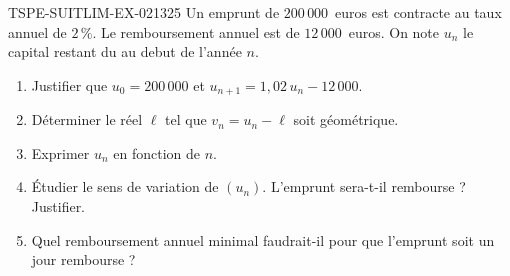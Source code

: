 \begin{exercice}{TSPE-SUITLIM-EX-021}{3}{25}
Un emprunt de $200\,000$~euros est contracte au taux annuel de $2\,\%$. Le remboursement annuel est de $12\,000$~euros. On note $u_n$ le capital restant du au debut de l'année $n$.
\begin{enumerate}
  \item Justifier que $u_0 = 200\,000$ et $u_{n+1} = 1{,}02\,u_n - 12\,000$.
  \item Déterminer le réel $\ell$ tel que $v_n = u_n - \ell$ soit géométrique.
  \item Exprimer $u_n$ en fonction de $n$.
  \item Étudier le sens de variation de $(u_n)$. L'emprunt sera-t-il rembourse ? Justifier.
  \item Quel remboursement annuel minimal faudrait-il pour que l'emprunt soit un jour rembourse ?
\end{enumerate}
\end{exercice}
